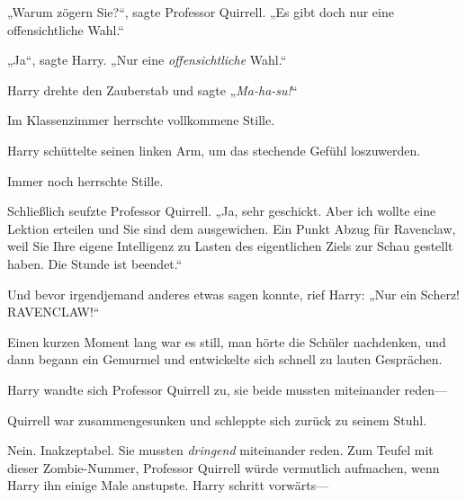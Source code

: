 „Warum zögern Sie?“, sagte Professor Quirrell. „Es gibt doch nur eine offensichtliche Wahl.“

„Ja“, sagte Harry. „Nur eine \emph{offensichtliche} Wahl.“

Harry drehte den Zauberstab und sagte „\emph{Ma-ha-su!}“

Im Klassenzimmer herrschte vollkommene Stille.

Harry schüttelte seinen linken Arm, um das stechende Gefühl loszuwerden.

Immer noch herrschte Stille.

Schließlich seufzte Professor Quirrell. „Ja, sehr geschickt. Aber ich wollte eine Lektion erteilen und Sie sind dem ausgewichen. Ein Punkt Abzug für Ravenclaw, weil Sie Ihre eigene Intelligenz zu Lasten des eigentlichen Ziels zur Schau gestellt haben. Die Stunde ist beendet.“


Und bevor irgendjemand anderes etwas sagen konnte, rief Harry: „Nur ein Scherz! RAVENCLAW!“

Einen kurzen Moment lang war es still, man hörte die Schüler nachdenken, und dann begann ein Gemurmel und entwickelte sich schnell zu lauten Gesprächen.

Harry wandte sich Professor Quirrell zu, sie beide mussten miteinander reden—

Quirrell war zusammengesunken und schleppte sich zurück zu seinem Stuhl.

Nein. Inakzeptabel. Sie mussten \emph{dringend} miteinander reden. Zum Teufel mit dieser Zombie-Nummer, Professor Quirrell würde vermutlich aufmachen, wenn Harry ihn einige Male anstupste. Harry schritt vorwärts—

